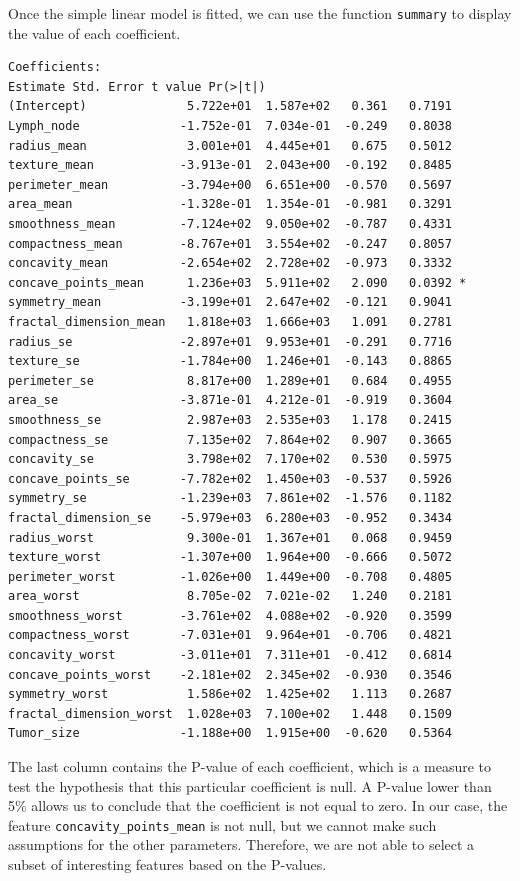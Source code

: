 \documentclass[]{report}
\begin{document}
Once the simple linear model is fitted, we can use the function \texttt{summary} to display the value of each coefficient.
\begin{verbatim}
Coefficients:
Estimate Std. Error t value Pr(>|t|)  
(Intercept)              5.722e+01  1.587e+02   0.361   0.7191  
Lymph_node              -1.752e-01  7.034e-01  -0.249   0.8038  
radius_mean              3.001e+01  4.445e+01   0.675   0.5012  
texture_mean            -3.913e-01  2.043e+00  -0.192   0.8485  
perimeter_mean          -3.794e+00  6.651e+00  -0.570   0.5697  
area_mean               -1.328e-01  1.354e-01  -0.981   0.3291  
smoothness_mean         -7.124e+02  9.050e+02  -0.787   0.4331  
compactness_mean        -8.767e+01  3.554e+02  -0.247   0.8057  
concavity_mean          -2.654e+02  2.728e+02  -0.973   0.3332  
concave_points_mean      1.236e+03  5.911e+02   2.090   0.0392 *
symmetry_mean           -3.199e+01  2.647e+02  -0.121   0.9041  
fractal_dimension_mean   1.818e+03  1.666e+03   1.091   0.2781  
radius_se               -2.897e+01  9.953e+01  -0.291   0.7716  
texture_se              -1.784e+00  1.246e+01  -0.143   0.8865  
perimeter_se             8.817e+00  1.289e+01   0.684   0.4955  
area_se                 -3.871e-01  4.212e-01  -0.919   0.3604  
smoothness_se            2.987e+03  2.535e+03   1.178   0.2415  
compactness_se           7.135e+02  7.864e+02   0.907   0.3665  
concavity_se             3.798e+02  7.170e+02   0.530   0.5975  
concave_points_se       -7.782e+02  1.450e+03  -0.537   0.5926  
symmetry_se             -1.239e+03  7.861e+02  -1.576   0.1182  
fractal_dimension_se    -5.979e+03  6.280e+03  -0.952   0.3434  
radius_worst             9.300e-01  1.367e+01   0.068   0.9459  
texture_worst           -1.307e+00  1.964e+00  -0.666   0.5072  
perimeter_worst         -1.026e+00  1.449e+00  -0.708   0.4805  
area_worst               8.705e-02  7.021e-02   1.240   0.2181  
smoothness_worst        -3.761e+02  4.088e+02  -0.920   0.3599  
compactness_worst       -7.031e+01  9.964e+01  -0.706   0.4821  
concavity_worst         -3.011e+01  7.311e+01  -0.412   0.6814  
concave_points_worst    -2.181e+02  2.345e+02  -0.930   0.3546  
symmetry_worst           1.586e+02  1.425e+02   1.113   0.2687  
fractal_dimension_worst  1.028e+03  7.100e+02   1.448   0.1509  
Tumor_size              -1.188e+00  1.915e+00  -0.620   0.5364  
\end{verbatim}

The last column contains the P-value of each coefficient, which is a measure to test the hypothesis that this particular coefficient is null. A P-value lower than 5\% allows us to conclude that the coefficient is not equal to zero. In our case, the feature \texttt{concavity\_points\_mean} is not null, but we cannot make such assumptions for the other parameters. Therefore, we are not able to select a subset of interesting features based on the P-values.
\end{document}
